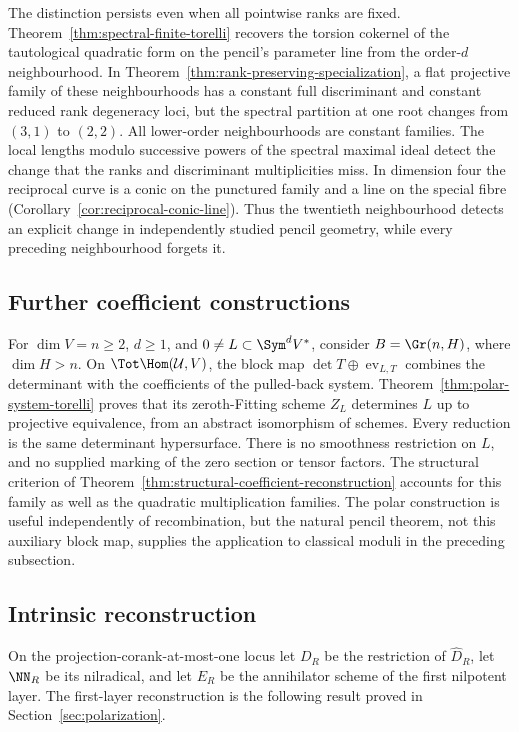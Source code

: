 The distinction persists even when all pointwise ranks are fixed.
Theorem~\ref{thm:spectral-finite-torelli} recovers the torsion
cokernel of the tautological quadratic form on the pencil's parameter
line from the order-\(d\) neighbourhood.  In
Theorem~\ref{thm:rank-preserving-specialization}, a flat projective
family of these neighbourhoods has a constant full discriminant and
constant reduced rank degeneracy loci, but the spectral partition at
one root changes from \((3,1)\) to \((2,2)\).  All lower-order
neighbourhoods are constant families.  The local lengths modulo
successive powers of the spectral maximal ideal detect the change
that the ranks and discriminant multiplicities miss.  In dimension
four the reciprocal curve is a conic on the punctured family and a
line on the special fibre
(Corollary~\ref{cor:reciprocal-conic-line}).  Thus the twentieth
neighbourhood detects an explicit change in independently studied
pencil geometry, while every preceding neighbourhood forgets it.

\subsection{Further coefficient constructions}

For \(\dim V=n\ge2\), \(d\ge1\), and
\(0\ne L\subset\Sym^dV^*\), consider \(B=\Gr(n,H)\),
where \(\dim H>n\).  On \(\Tot\Hom(\mathcal U,V)\), the
block map \(\det T\oplus\operatorname{ev}_{L,T}\) combines
the determinant with the coefficients of the pulled-back system.
Theorem~\ref{thm:polar-system-torelli} proves that its zeroth-Fitting
scheme \(Z_L\) determines \(L\) up to projective equivalence,
from an abstract isomorphism of schemes.  Every reduction is the same
determinant hypersurface.  There is no smoothness restriction on
\(L\), and no supplied marking of the zero section or tensor factors.
The structural criterion of
Theorem~\ref{thm:structural-coefficient-reconstruction} accounts for
this family as well as the quadratic multiplication families.
The polar construction is useful independently of recombination, but
the natural pencil theorem, not this auxiliary block map, supplies
the application to classical moduli in the preceding subsection.

\subsection{Intrinsic reconstruction}

On the projection-corank-at-most-one locus let \(D_R\) be the
restriction of \(\widehat D_R\), let \(\NN_R\) be its
nilradical, and let \(E_R\) be the annihilator scheme of the first
nilpotent layer.  The first-layer reconstruction is the following result
proved in Section~\ref{sec:polarization}.

